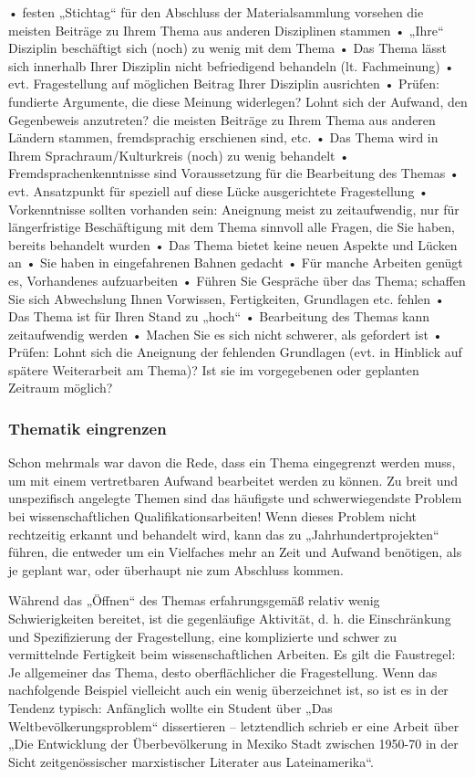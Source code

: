 \documentclass[]{article}
\begin{document}
• festen „Stichtag`` für den Abschluss der Materialsammlung vorsehen die
meisten Beiträge zu Ihrem Thema aus anderen Disziplinen stammen •
„Ihre`` Disziplin beschäftigt sich (noch) zu wenig mit dem Thema • Das
Thema lässt sich innerhalb Ihrer Disziplin nicht befriedigend behandeln
(lt. Fachmeinung) • evt. Fragestellung auf möglichen Beitrag Ihrer
Disziplin ausrichten • Prüfen: fundierte Argumente, die diese Meinung
widerlegen? Lohnt sich der Aufwand, den Gegenbeweis anzutreten? die
meisten Beiträge zu Ihrem Thema aus anderen Ländern stammen,
fremdsprachig erschienen sind, etc. • Das Thema wird in Ihrem
Sprachraum/Kulturkreis (noch) zu wenig behandelt •
Fremdsprachenkenntnisse sind Voraussetzung für die Bearbeitung des
Themas • evt. Ansatzpunkt für speziell auf diese Lücke ausgerichtete
Fragestellung • Vorkenntnisse sollten vorhanden sein: Aneignung meist zu
zeitaufwendig, nur für längerfristige Beschäftigung mit dem Thema
sinnvoll alle Fragen, die Sie haben, bereits behandelt wurden • Das
Thema bietet keine neuen Aspekte und Lücken an • Sie haben in
eingefahrenen Bahnen gedacht • Für manche Arbeiten genügt es,
Vorhandenes aufzuarbeiten • Führen Sie Gespräche über das Thema;
schaffen Sie sich Abwechslung Ihnen Vorwissen, Fertigkeiten, Grundlagen
etc. fehlen • Das Thema ist für Ihren Stand zu „hoch`` • Bearbeitung des
Themas kann zeitaufwendig werden • Machen Sie es sich nicht schwerer,
als gefordert ist • Prüfen: Lohnt sich die Aneignung der fehlenden
Grundlagen (evt. in Hinblick auf spätere Weiterarbeit am Thema)? Ist sie
im vorgegebenen oder geplanten Zeitraum möglich?

\subsubsection{Thematik eingrenzen}\label{thematik-eingrenzen}

Schon mehrmals war davon die Rede, dass ein Thema eingegrenzt werden
muss, um mit einem vertretbaren Aufwand bearbeitet werden zu können. Zu
breit und unspezifisch angelegte Themen sind das häufigste und
schwerwiegendste Problem bei wissenschaftlichen Qualifikationsarbeiten!
Wenn dieses Problem nicht rechtzeitig erkannt und behandelt wird, kann
das zu „Jahrhundertprojekten`` führen, die entweder um ein Vielfaches
mehr an Zeit und Aufwand benötigen, als je geplant war, oder überhaupt
nie zum Abschluss kommen.

Während das „Öffnen`` des Themas erfahrungsgemäß relativ wenig
Schwierigkeiten bereitet, ist die gegenläufige Aktivität, d. h. die
Einschränkung und Spezifizierung der Fragestellung, eine komplizierte
und schwer zu vermittelnde Fertigkeit beim wissenschaftlichen Arbeiten.
Es gilt die Faustregel: Je allgemeiner das Thema, desto oberflächlicher
die Fragestellung. Wenn das nachfolgende Beispiel vielleicht auch ein
wenig überzeichnet ist, so ist es in der Tendenz typisch: Anfänglich
wollte ein Student über „Das Weltbevölkerungsproblem`` dissertieren --
letztendlich schrieb er eine Arbeit über „Die Entwicklung der
Überbevölkerung in Mexiko Stadt zwischen 1950-70 in der Sicht
zeitgenössischer marxistischer Literater aus Lateinamerika``.
\end{document}
